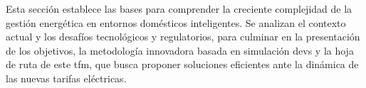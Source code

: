 \documentclass[11pt,a4paper]{book}
\begin{document}
%
%
%
%
%
Esta sección establece las bases para comprender la creciente complejidad de la gestión energética en entornos domésticos inteligentes. Se analizan el contexto actual y los desafíos tecnológicos y regulatorios, para culminar en la presentación de los objetivos, la metodología innovadora basada en simulación \gls{devs} y la hoja de ruta de este \gls{tfm}, que busca proponer soluciones eficientes ante la dinámica de las nuevas tarifas eléctricas.
\end{document}
